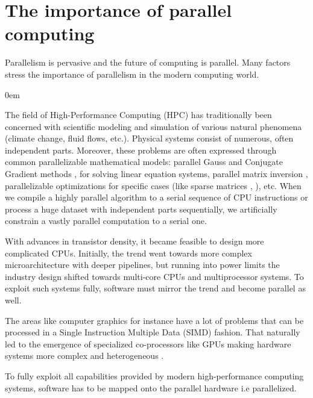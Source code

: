 \section{The importance of parallel computing}
\label{background_importance}
\quad Parallelism is pervasive and the future of computing is parallel. Many factors stress the importance of parallelism in the modern computing world.
\begin{description}[style=unboxed,leftmargin=0cm]
\itemsep0em
\item[Abundance of natural parallelism] The field of High-Performance Computing (HPC) has traditionally been concerned with scientific modeling and simulation of various natural phenomena (climate change, fluid flows, etc.). Physical systems consist of numerous, often independent parts. Moreover, these problems are often expressed through common parallelizable mathematical models: parallel Gauss \cite{SHANG20091369} and Conjugate Gradient methods \cite{10.1007/978-3-642-14390-8_14}, \cite{HELFENSTEIN20123584} for solving linear equation systems, parallel matrix inversion \cite{SHARMA201331}, parallelizable optimizations for specific cases (like sparse matrices \cite{CHEN201849}, \cite{DEVECI201833}), etc. When we compile a highly parallel algorithm to a serial sequence of CPU instructions or process a huge dataset with independent parts sequentially, we artificially constrain a vastly parallel computation to a serial one.
\item[Semiconductor technology advances and power limits] With advances in transistor density, it became feasible to design more complicated CPUs. Initially, the trend went towards more complex microarchitecture with deeper pipelines, but running into power limits the industry design shifted towards multi-core CPUs and multiprocessor systems. To exploit such systems fully, software must mirror the trend and become parallel as well.
\item[Domain inherent parallelism and specialized computations] The areas like computer graphics for instance have a lot of problems that can be processed in a Single Instruction Multiple Data (SIMD) fashion. That naturally led to the emergence of specialized co-processors like GPUs making hardware systems more complex and heterogeneous \cite{cpu-heterogenuity}.
\end{description}
\quad To fully exploit all capabilities provided by modern high-performance computing systems, software has to be mapped onto the parallel hardware i.e parallelized.

